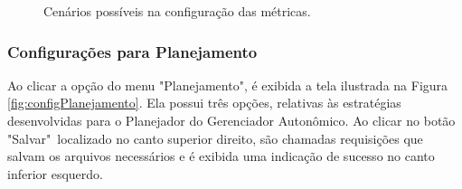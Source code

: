 \documentclass[Portugues,Final]{ic-tese-v3}
\begin{document}
\begin{figure}[H]
    \centering
    \caption{Cenários possíveis na configuração das métricas.}
    \label{fig:cenariosMetricas}
\end{figure}

\subsubsection{Configurações para Planejamento}

Ao clicar a opção do menu "Planejamento", é exibida a tela ilustrada na Figura \ref{fig:configPlanejamento}. Ela possui três opções, relativas às estratégias desenvolvidas para o Planejador do Gerenciador Autonômico. Ao clicar no botão "Salvar"~localizado no canto superior direito, são chamadas requisições que salvam os arquivos necessários e é exibida uma indicação de sucesso no canto inferior esquerdo.
\end{document}
